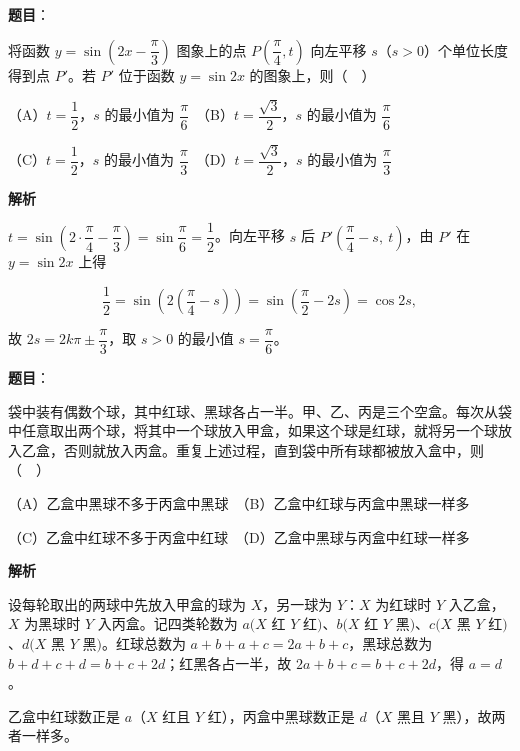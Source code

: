 \begin{answer}

\textbf{题目}：

将函数 \(y=\sin\left(2x-\dfrac{\pi}{3}\right)\) 图象上的点 \(P\left(\dfrac{\pi}{4},t\right)\) 向左平移 \(s\)（\(s>0\)）个单位长度得到点 \(P'\)。若 \(P'\) 位于函数 \(y=\sin 2x\) 的图象上，则（　）

（A）\(t=\dfrac{1}{2}\)，\(s\) 的最小值为 \(\dfrac{\pi}{6}\)　（B）\(t=\dfrac{\sqrt{3}}{2}\)，\(s\) 的最小值为 \(\dfrac{\pi}{6}\)

（C）\(t=\dfrac{1}{2}\)，\(s\) 的最小值为 \(\dfrac{\pi}{3}\)　（D）\(t=\dfrac{\sqrt{3}}{2}\)，\(s\) 的最小值为 \(\dfrac{\pi}{3}\)

\textbf{解析}

\(t=\sin\left(2\cdot\dfrac{\pi}{4}-\dfrac{\pi}{3}\right)=\sin\dfrac{\pi}{6}=\dfrac12\)。向左平移 \(s\) 后 \(P'\left(\dfrac{\pi}{4}-s,\ t\right)\)，由 \(P'\) 在 \(y=\sin 2x\) 上得

\nopagebreak[4]
\[
\frac12=\sin\left(2\left(\frac{\pi}{4}-s\right)\right)=\sin\left(\frac{\pi}{2}-2s\right)=\cos 2s,
\]

故 \(2s=2k\pi\pm\dfrac{\pi}{3}\)，取 \(s>0\) 的最小值 \(s=\dfrac{\pi}{6}\)。


\end{answer}
\begin{answer}

\textbf{题目}：

袋中装有偶数个球，其中红球、黑球各占一半。甲、乙、丙是三个空盒。每次从袋中任意取出两个球，将其中一个球放入甲盒，如果这个球是红球，就将另一个球放入乙盒，否则就放入丙盒。重复上述过程，直到袋中所有球都被放入盒中，则（　）

（A）乙盒中黑球不多于丙盒中黑球　（B）乙盒中红球与丙盒中黑球一样多

（C）乙盒中红球不多于丙盒中红球　（D）乙盒中黑球与丙盒中红球一样多

\textbf{解析}

设每轮取出的两球中先放入甲盒的球为 \(X\)，另一球为 \(Y\)：\(X\) 为红球时 \(Y\) 入乙盒，\(X\) 为黑球时 \(Y\) 入丙盒。记四类轮数为 \(a(X\) 红 \(Y\) 红\()\)、\(b(X\) 红 \(Y\) 黑\()\)、\(c(X\) 黑 \(Y\) 红\()\)、\(d(X\) 黑 \(Y\) 黑\()\)。红球总数为 \(a+b+a+c=2a+b+c\)，黑球总数为 \(b+d+c+d=b+c+2d\)；红黑各占一半，故 \(2a+b+c=b+c+2d\)，得 \(a=d\)。

乙盒中红球数正是 \(a\)（\(X\) 红且 \(Y\) 红），丙盒中黑球数正是 \(d\)（\(X\) 黑且 \(Y\) 黑），故两者一样多。


\end{answer}
